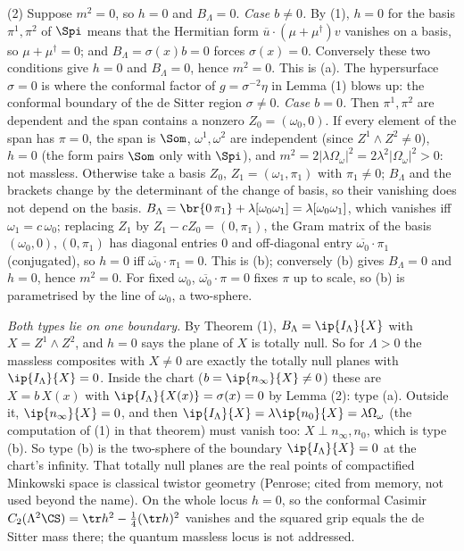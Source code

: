(2) Suppose $m^{2} = 0$, so $h = 0$ and $B_{\Lambda} = 0$.
\emph{Case $b \neq 0$.} By (1), $h = 0$ for the basis $\pi^{1}, \pi^{2}$ of $\Spi$ means that the Hermitian form $\overline{u}\cdot(\mu + \mu^{\dagger})v$ vanishes on a basis, so $\mu + \mu^{\dagger} = 0$; and $B_{\Lambda} = \sigma(x)b = 0$ forces $\sigma(x) = 0$. Conversely these two conditions give $h = 0$ and $B_{\Lambda} = 0$, hence $m^{2} = 0$. This is (a). The hypersurface $\sigma = 0$ is where the conformal factor of $g = \sigma^{-2}\eta$ in Lemma (1) blows up: the conformal boundary of the de Sitter region $\sigma \neq 0$.
\emph{Case $b = 0$.} Then $\pi^{1}, \pi^{2}$ are dependent and the span contains a nonzero $Z_{0} = (\omega_{0}, 0)$. If every element of the span has $\pi = 0$, the span is $\Som$, $\omega^{1}, \omega^{2}$ are independent (since $Z^{1}\wedge Z^{2} \ne 0$), $h = 0$ (the form pairs $\Som$ only with $\Spi$), and $m^{2} = 2|\lambda\Omega_{\omega}|^{2} = 2\lambda^{2}|\Omega_{\omega}|^{2} > 0$: not massless. Otherwise take a basis $Z_{0}$, $Z_{1} = (\omega_{1}, \pi_{1})$ with $\pi_{1} \ne 0$; $B_{\Lambda}$ and the brackets change by the determinant of the change of basis, so their vanishing does not depend on the basis. $B_{\Lambda} = \br{0\,\pi_{1}} + \lambda[\omega_{0}\omega_{1}] = \lambda[\omega_{0}\omega_{1}]$, which vanishes iff $\omega_{1} = c\,\omega_{0}$; replacing $Z_{1}$ by $Z_{1} - cZ_{0} = (0, \pi_{1})$, the Gram matrix of the basis $(\omega_{0}, 0), (0, \pi_{1})$ has diagonal entries $0$ and off-diagonal entry $\overline{\omega_{0}}\cdot\pi_{1}$ (conjugated), so $h = 0$ iff $\overline{\omega_{0}}\cdot\pi_{1} = 0$. This is (b); conversely (b) gives $B_{\Lambda} = 0$ and $h = 0$, hence $m^{2} = 0$. For fixed $\omega_{0}$, $\overline{\omega_{0}}\cdot\pi = 0$ fixes $\pi$ up to scale, so (b) is parametrised by the line of $\omega_{0}$, a two-sphere.

\emph{Both types lie on one boundary.} By Theorem (1), $B_{\Lambda} = \ip{I_{\Lambda}}{X}$ with $X = Z^{1}\wedge Z^{2}$, and $h = 0$ says the plane of $X$ is totally null. So for $\Lambda > 0$ the massless composites with $X \neq 0$ are exactly the totally null planes with $\ip{I_{\Lambda}}{X} = 0$. Inside the chart ($b = \ip{n_{\infty}}{X} \neq 0$) these are $X = b\,X(x)$ with $\ip{I_{\Lambda}}{X(x)} = \sigma(x) = 0$ by Lemma (2): type (a). Outside it, $\ip{n_{\infty}}{X} = 0$, and then $\ip{I_{\Lambda}}{X} = \lambda\ip{n_{0}}{X} = \lambda\Omega_{\omega}$ (the computation of (1) in that theorem) must vanish too: $X \perp n_{\infty}, n_{0}$, which is type (b). So type (b) is the two-sphere of the boundary $\ip{I_{\Lambda}}{X} = 0$ at the chart's infinity. That totally null planes are the real points of compactified Minkowski space is classical twistor geometry (Penrose; cited from memory, not used beyond the name). On the whole locus $h = 0$, so the conformal Casimir $C_{2}(\Lambda^{2}\CS) = \tr h^{2} - \tfrac14(\tr h)^{2}$ vanishes and the squared grip equals the de Sitter mass there; the quantum massless locus is not addressed.


